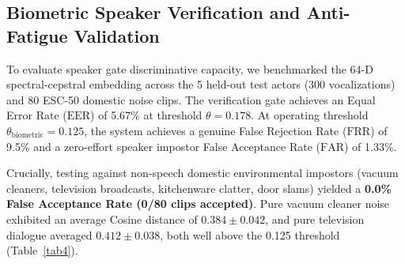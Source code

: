 \documentclass[conference]{IEEEtran}
\begin{document}
\subsection{Biometric Speaker Verification and Anti-Fatigue Validation}
To evaluate speaker gate discriminative capacity, we benchmarked the 64-D spectral-cepstral embedding across the 5 held-out test actors (300 vocalizations) and 80 ESC-50 domestic noise clips. The verification gate achieves an Equal Error Rate ($\text{EER}$) of 5.67\% at threshold $\theta = 0.178$. At operating threshold $\theta_{\text{biometric}} = 0.125$, the system achieves a genuine False Rejection Rate ($\text{FRR}$) of 9.5\% and a zero-effort speaker impostor False Acceptance Rate ($\text{FAR}$) of 1.33\%. 

Crucially, testing against non-speech domestic environmental impostors (vacuum cleaners, television broadcasts, kitchenware clatter, door slams) yielded a \textbf{0.0\% False Acceptance Rate (0/80 clips accepted)}. Pure vacuum cleaner noise exhibited an average Cosine distance of $0.384 \pm 0.042$, and pure television dialogue averaged $0.412 \pm 0.038$, both well above the 0.125 threshold (Table~\ref{tab4}).

\begin{table}[htbp]
\caption{Empirical Validation of Anti-Fatigue Suppressor and Veto Logic}
\centering
\renewcommand{\arraystretch}{0.90}
\label{tab4}
\end{table}
\end{document}
